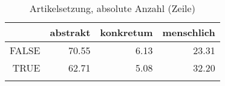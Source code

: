 \begin{table}[ht]
\centering
\begin{tabular}{rrrr}
  \lsptoprule
 & abstrakt & konkretum & menschlich \\ 
  \midrule
FALSE & 70.55 & 6.13 & 23.31 \\ 
  TRUE & 62.71 & 5.08 & 32.20 \\ 
   \lspbottomrule
\end{tabular}
\caption{Artikelsetzung, absolute Anzahl (Zeile)} 
\end{table}
